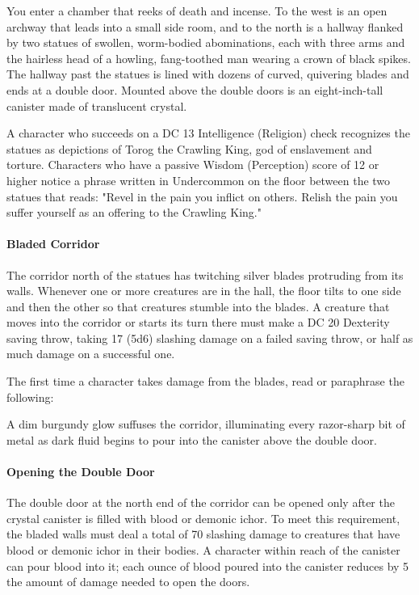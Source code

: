 \documentclass[letterpaper, 11pt, bg=full, twocolumn]{dndbook}
\begin{document}
\begin{DndReadAloud}
You enter a chamber that reeks of death and incense. To the west is an open archway that leads into a small side room, and to the north is a hallway flanked by two statues of swollen, worm-bodied abominations, each with three arms and the hairless head of a howling, fang-toothed man wearing a crown of black spikes.
The hallway past the statues is lined with dozens of curved, quivering blades and ends at a double door. Mounted above the double doors is an eight-inch-tall canister made of translucent crystal.
\end{DndReadAloud}

A character who succeeds on a DC 13 Intelligence (Religion) check recognizes the statues as depictions of Torog the Crawling King, god of enslavement and torture. Characters who have a passive Wisdom (Perception) score of 12 or higher notice a phrase written in Undercommon on the floor between the two statues that reads: "Revel in the pain you inflict on others. Relish the pain you suffer yourself as an offering to the Crawling King."

\paragraph{Bladed Corridor}

The corridor north of the statues has twitching silver blades protruding from its walls. Whenever one or more creatures are in the hall, the floor tilts to one side and then the other so that creatures stumble into the blades. A creature that moves into the corridor or starts its turn there must make a DC 20 Dexterity saving throw, taking 17 (5d6) slashing damage on a failed saving throw, or half as much damage on a successful one.

The first time a character takes damage from the blades, read or paraphrase the following:

\begin{DndReadAloud}
A dim burgundy glow suffuses the corridor, illuminating every razor-sharp bit of metal as dark fluid begins to pour into the canister above the double door.
\end{DndReadAloud}

\paragraph{Opening the Double Door}

The double door at the north end of the corridor can be opened only after the crystal canister is filled with blood or demonic ichor. To meet this requirement, the bladed walls must deal a total of 70 slashing damage to creatures that have blood or demonic ichor in their bodies. A character within reach of the canister can pour blood into it; each ounce of blood poured into the canister reduces by 5 the amount of damage needed to open the doors.
\end{document}
